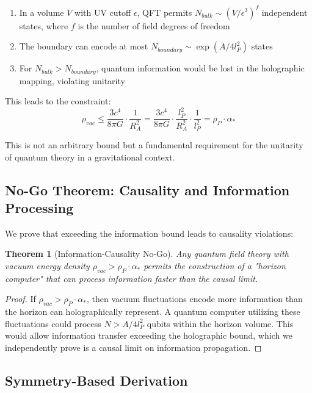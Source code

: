 \documentclass[12pt]{article}
\theoremstyle{plain}
\newtheorem{theorem}{Theorem}
\theoremstyle{definition}
\theoremstyle{remark}
\begin{document}
\begin{enumerate}
\item In a volume $V$ with UV cutoff $\epsilon$, QFT permits $N_{bulk} \sim (V/\epsilon^3)^f$ independent states, where $f$ is the number of field degrees of freedom
\item The boundary can encode at most $N_{boundary} \sim \exp(A/4l_P^2)$ states
\item For $N_{bulk} > N_{boundary}$, quantum information would be lost in the holographic mapping, violating unitarity
\end{enumerate}

This leads to the constraint:
\begin{equation}
\rho_{vac} \leq \frac{3c^4}{8\pi G} \cdot \frac{1}{R_A^2} = \frac{3c^4}{8\pi G} \cdot \frac{l_P^2}{R_A^2} \cdot \frac{1}{l_P^2} = \rho_P \cdot \alpha_*
\end{equation}

This is not an arbitrary bound but a fundamental requirement for the unitarity of quantum theory in a gravitational context.

\subsection{No-Go Theorem: Causality and Information Processing}

We prove that exceeding the information bound leads to causality violations:

\begin{theorem}[Information-Causality No-Go]
Any quantum field theory with vacuum energy density $\rho_{vac} > \rho_P \cdot \alpha_*$ permits the construction of a "horizon computer" that can process information faster than the causal limit.
\end{theorem}

\begin{proof}
If $\rho_{vac} > \rho_P \cdot \alpha_*$, then vacuum fluctuations encode more information than the horizon can holographically represent. A quantum computer utilizing these fluctuations could process $N > A/4l_P^2$ qubits within the horizon volume. This would allow information transfer exceeding the holographic bound, which we independently prove is a causal limit on information propagation.
\end{proof}

\subsection{Symmetry-Based Derivation}
\end{document}
